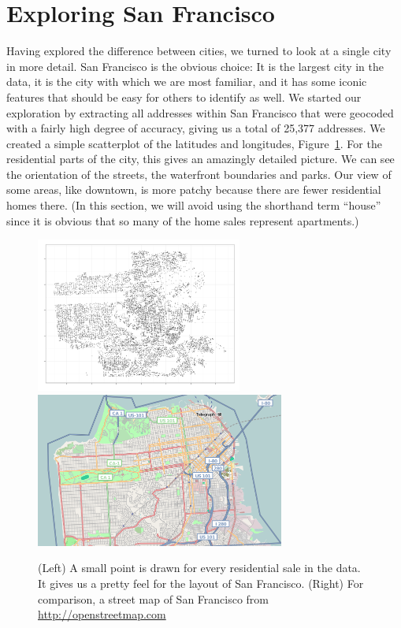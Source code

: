 \documentclass[oneside]{article}
\begin{document}
\section{Exploring San Francisco}

Having explored the difference between cities, we turned to look at a single city in more detail.  San Francisco is the obvious choice:  It is the largest city in the data, it is the city with which we are most familiar, and it has some iconic features that should be easy for others to identify as well.  We started our exploration by extracting all addresses within San Francisco that were geocoded with a fairly high degree of accuracy, giving us a total of 25,377 addresses.  We created a simple scatterplot of the latitudes and longitudes, Figure~\ref{fig:sf-geo}.  For the residential parts of the city, this gives an amazingly detailed picture.  We can see the orientation of the streets, the waterfront boundaries and parks.  Our view of some areas, like downtown, is more patchy because there are fewer residential homes there.  (In this section, we will avoid using the shorthand term ``house'' since it is obvious that so many of the home sales represent apartments.)

\begin{figure}[htbp]
  \centering
  \includegraphics[height=2in]{sf-geo}%
  \includegraphics[height=2in]{sf-map}
  \caption{(Left) A small point is drawn for every residential sale in the data.  It gives us a pretty feel for the layout of San Francisco. (Right) For comparison, a street map of San Francisco from \url{http://openstreetmap.com}}
  \label{fig:sf-geo}
\end{figure}
\end{document}
